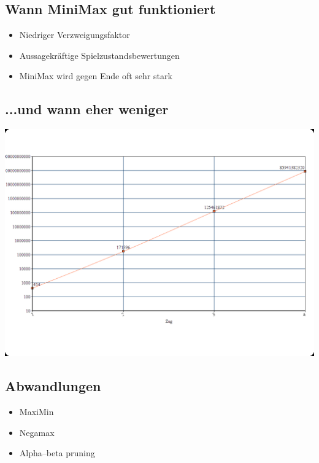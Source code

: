 \documentclass[12pt]{beamer}
\begin{document}
\subsection{Wann MiniMax gut funktioniert}
\begin{frame}
    \begin{itemize}
      \item<1-| alert@4> Niedriger Verzweigungsfaktor
      \item<2-> Aussagekräftige Spielzustandsbewertungen
      \item<3-> MiniMax wird gegen Ende oft sehr stark
    \end{itemize}
\end{frame}

\subsection{...und wann eher weniger}
\begin{frame}
	\includegraphics[width=\linewidth]{media/mmexp1.png}
\end{frame}

\subsection{Abwandlungen}
\begin{frame}
    \begin{itemize}
		\item<1-> MaxiMin
		\item<2-> Negamax
		\item<3-> Alpha–beta pruning
    \end{itemize}
\end{frame}
\end{document}
